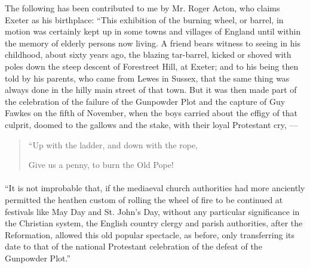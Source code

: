 \documentclass[a4paper, 11pt, oneside, polutonikogreek, english]{article}
\begin{document}
The following has been contributed to me by Mr. Roger Acton, who claims Exeter as his birthplace: ``This exhibition of the burning wheel, or barrel, in motion was certainly kept up in some towns and villages of England until within the memory of elderly persons now living. A friend bears witness to seeing in his childhood, about sixty years ago, the blazing tar-barrel, kicked or shoved with poles down the steep descent of Forestreet Hill, at Exeter; and to his being then told by his parents, who came from Lewes in Sussex, that the same thing was always done in the hilly main street of that town. But it was then made part of the celebration of the failure of the Gunpowder Plot and the capture of Guy Fawkes on the fifth of November, when the boys carried about the effigy of that culprit, doomed to the gallows and the stake, with their loyal Protestant cry, ---

\begin{quotation}\small
``Up with the ladder, and down with the rope,

Give us a penny, to burn the Old Pope!
\end{quotation}
\paragraph{}
``It is not improbable that, if the mediaeval church authorities had more anciently permitted the heathen custom of rolling the wheel of fire to be continued at festivals like May Day and St. John's Day, without any particular significance in the Christian system, the English country clergy and parish authorities, after the Reformation, allowed this old popular spectacle, as before, only transferring its date to that of the national Protestant celebration of the defeat of the Gunpowder Plot.''
\end{document}
